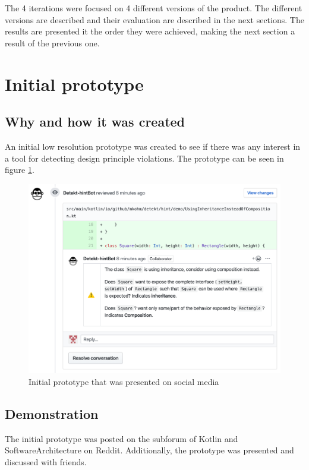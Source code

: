 \documentclass{report}
\begin{document}
The 4 iterations were focused on 4 different versions of the product. The different versions are described and their evaluation are described in the next sections. The results are presented it the order they were achieved, making the next section a result of the previous one.

\section{Initial prototype}

\subsection*{Why and how it was created}
An initial low resolution prototype was created to see if there was any interest in a tool for detecting design principle violations. The prototype can be seen in figure \ref{fig:mockup}.

\begin{figure}[h!]
    \centering
    \includegraphics[width=\textwidth]{../images/demo.png}
    \caption{Initial prototype that was presented on social media}
    \label{fig:mockup}
\end{figure}

\subsection*{Demonstration}
The initial prototype was posted on the subforum of Kotlin\cite{kotlin-reddit} and SoftwareArchitecture\cite{softwarearch-reddit} on Reddit. Additionally, the prototype was presented and discussed with friends. 
\end{document}
